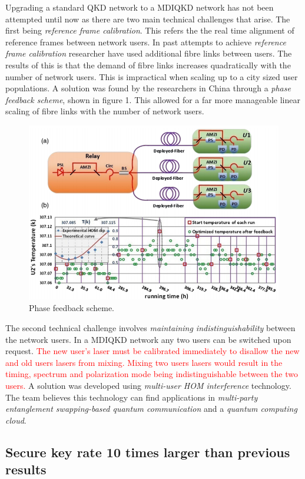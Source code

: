 \documentclass{article}
\begin{document}
\vspace*{1mm}

Upgrading a standard QKD network to a MDIQKD network has not been attempted until now as there are two main technical challenges that arise. The first being \textit{reference frame calibration}. This refers the the real time alignment of reference frames between network users. In past attempts to achieve \textit{reference frame calibration} researcher have used additional fibre links between users. The results of this is that the demand of fibre links increases quadratically with the number of network users. This is impractical when scaling up to a city sized user populations. A solution was found by the researchers in China through a \textit{phase feedback scheme}, shown in figure 1. This allowed for a far more manageable linear scaling of fibre links with the number of network users.

\begin{figure}
  \centering 
  \includegraphics[width=0.7\linewidth]{phase_feedback_scheme.png}
  \caption{Phase feedback scheme.}
  \label{figure 1}
\end{figure}

The second technical challenge involves \textit{maintaining indistinguishability} between the network users. In a MDIQKD network any two users can be switched upon request. \textcolor{red}{ The new user's laser must be calibrated immediately to disallow the new and old users lasers from mixing. Mixing two users lasers would result in the timing, spectrum and polarization mode being indistinguishable between the two users.} A solution was developed using \textit{multi-user HOM interference} technology. The team believes this technology can find applications in \textit{multi-party entanglement swapping-based quantum communication} and a \textit{quantum computing cloud}.

\subsection*{Secure key rate 10 times larger than previous results}
\end{document}
